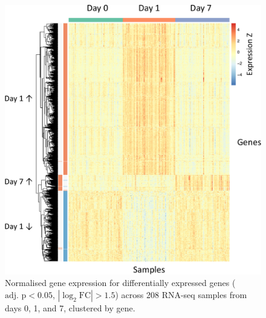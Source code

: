 \begin{figure}
    \includegraphics[width=1.0\textwidth]{mainmatter/figures/chapter_02/graphics_ashg19/plot_dge_eqtl.heatmap_dge.annotated-crop.pdf}
    \caption{Normalised gene expression for differentially expressed genes ($\text{adj. p} < 0.05$, $\left|\log_2\text{FC}\right| > 1.5$) across 208 RNA-seq samples from days 0, 1, and 7, clustered by gene.}
    \label{fig:hird_dge_heatmap}
\end{figure}

